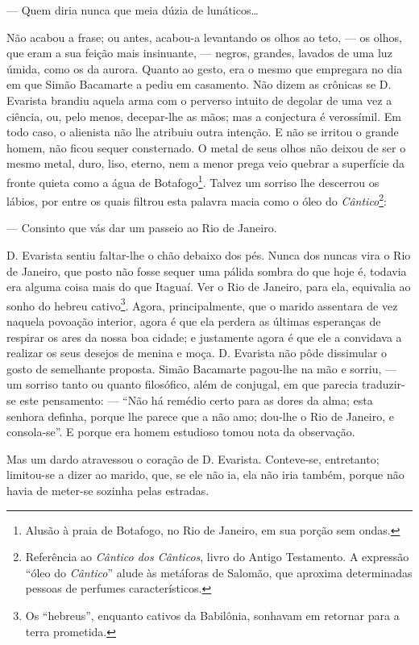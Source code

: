 --- Quem diria nunca que meia dúzia de lunáticos\ldots{}

Não acabou a frase; ou antes, acabou-a levantando os olhos ao teto, ---
os olhos, que eram a sua feição mais insinuante, --- negros, grandes,
lavados de uma luz úmida, como os da aurora. Quanto ao gesto, era o
mesmo que empregara no dia em que Simão Bacamarte a pediu em casamento.
Não dizem as crônicas se D. Evarista brandiu aquela arma com o perverso
intuito de degolar de uma vez a ciência, ou, pelo menos, decepar-lhe as
mãos; mas a conjectura é verossímil. Em todo caso, o alienista não lhe
atribuiu outra intenção. E não se irritou o grande homem, não ficou
sequer consternado. O metal de seus olhos não deixou de ser o mesmo
metal, duro, liso, eterno, nem a menor prega veio quebrar a superfície
da fronte quieta como a água de Botafogo\footnote{Alusão à praia de
  Botafogo, no Rio de Janeiro, em sua porção sem ondas.}. Talvez um
sorriso lhe descerrou os lábios, por entre os quais filtrou esta palavra
macia como o óleo do \emph{Cântico}\footnote{Referência ao \emph{Cântico
  dos Cânticos}, livro do Antigo Testamento. A expressão ``óleo do
  \emph{Cântico}'' alude às metáforas de Salomão, que aproxima
  determinadas pessoas de perfumes característicos.}:

--- Consinto que vás dar um passeio ao Rio de Janeiro.

D. Evarista sentiu faltar-lhe o chão debaixo dos pés. Nunca dos nuncas
vira o Rio de Janeiro, que posto não fosse sequer uma pálida sombra do
que hoje é, todavia era alguma coisa mais do que Itaguaí. Ver o Rio de
Janeiro, para ela, equivalia ao sonho do hebreu cativo\footnote{Os
  ``hebreus'', enquanto cativos da Babilônia, sonhavam em retornar para
  a terra prometida.}. Agora, principalmente, que o marido assentara de
vez naquela povoação interior, agora é que ela perdera as últimas
esperanças de respirar os ares da nossa boa cidade; e justamente agora é
que ele a convidava a realizar os seus desejos de menina e moça. D.
Evarista não pôde dissimular o gosto de semelhante proposta. Simão
Bacamarte pagou-lhe na mão e sorriu, --- um sorriso tanto ou quanto
filosófico, além de conjugal, em que parecia traduzir-se este
pensamento: --- ``Não há remédio certo para as dores da alma; esta
senhora definha, porque lhe parece que a não amo; dou-lhe o Rio de
Janeiro, e consola-se''. E porque era homem estudioso tomou nota da
observação.

Mas um dardo atravessou o coração de D. Evarista. Conteve-se,
entretanto; limitou-se a dizer ao marido, que, se ele não ia, ela não
iria também, porque não havia de meter-se sozinha pelas estradas.

